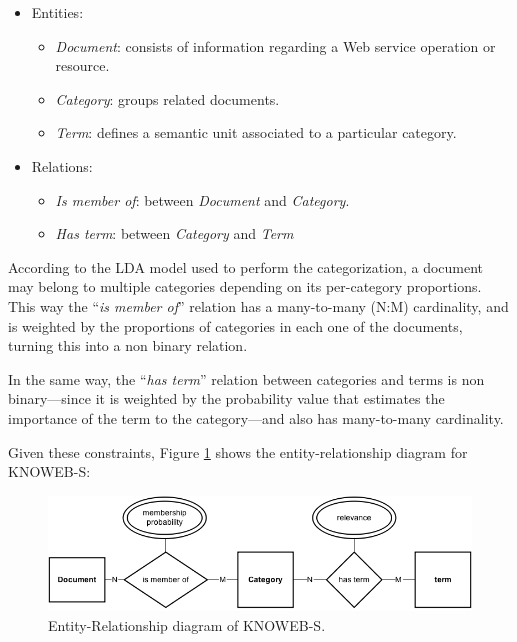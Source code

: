 \begin{itemize}
\item Entities: 
\begin{itemize}
\item \emph{Document}: consists of information regarding a Web service operation or resource. 
\item \emph{Category}: groups related documents. 
\item \emph{Term}: defines a semantic unit associated to a particular category.
\end{itemize}

\item Relations: 
\begin{itemize}
\item \emph{Is member of}: between \emph{Document} and \emph{Category}. 
\item \emph{Has term}: between \emph{Category} and \emph{Term}
\end{itemize}
\end{itemize}

According to the LDA model used to perform the categorization, a document may belong to multiple categories depending on its per-category proportions.
This way the ``\emph{is member of}'' relation has a many-to-many (N:M) cardinality, and is weighted by the proportions of categories in each one of the documents, turning this into a non binary relation.

In the same way, the ``\emph{has term}'' relation between categories and terms is non binary---since it is weighted by the probability value that estimates the importance of the term to the category---and also has many-to-many cardinality.

Given these constraints, Figure \ref{data-model-KNOWEBS} shows the entity-relationship diagram for KNOWEB-S:

\begin{figure}
\includegraphics[scale=0.43]{images/KNOWEB-S-ER-en}

\caption{Entity-Relationship diagram of KNOWEB-S.}
\label{data-model-KNOWEBS}

\end{figure}

